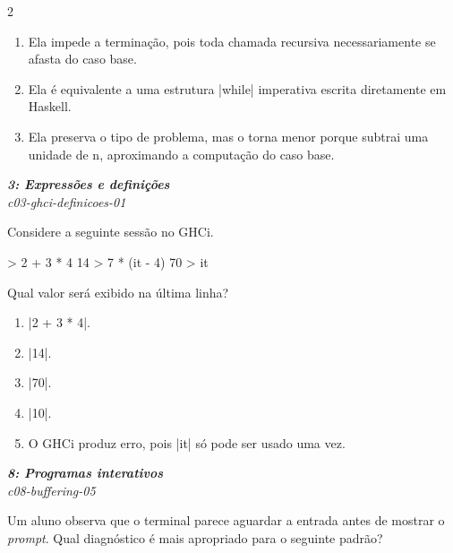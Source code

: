 \documentclass[a4paper,10pt,brazil]{article}
\begin{document}
\begin{multicols}{2}
\begin{enumerate}
  \item Ela impede a terminação, pois toda chamada recursiva necessariamente se afasta do caso base.

  \item Ela é equivalente a uma estrutura \haskellinline|while| imperativa escrita diretamente em Haskell.

  \item Ela preserva o tipo de problema, mas o torna menor porque subtrai uma unidade de n, aproximando a computação do caso base.


\end{enumerate}

\begin{flushright}
  \footnotesize
  \textit{\textbf{3: Expressões e definições}}\\
  \textit{c03-ghci-definicoes-01}\\

\end{flushright}
Considere a seguinte sessão no GHCi.

\begin{haskellcode}
> 2 + 3 * 4
14
> 7 * (it - 4)
70
> it
\end{haskellcode}

Qual valor será exibido na última linha?

\begin{enumerate}
  \item \haskellinline|2 + 3 * 4|.

  \item \haskellinline|14|.

  \item \haskellinline|70|.

  \item \haskellinline|10|.

  \item O GHCi produz erro, pois \haskellinline|it| só pode ser usado uma vez.


\end{enumerate}

\begin{flushright}
  \footnotesize
  \textit{\textbf{8: Programas interativos}}\\
  \textit{c08-buffering-05}\\

\end{flushright}
Um aluno observa que o terminal parece aguardar a entrada antes de mostrar o \emph{prompt}. Qual diagnóstico é mais apropriado para o seguinte padrão?


\end{multicols}
\end{document}

